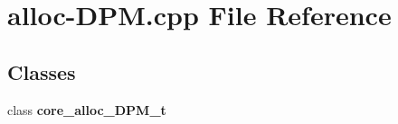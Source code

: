 \section{alloc-DPM.cpp File Reference}
\label{alloc-DPM_8cpp}
\subsection*{Classes}
\begin{CompactItemize}
\item 
class {\bf core\_\-alloc\_\-DPM\_\-t}
\end{CompactItemize}
